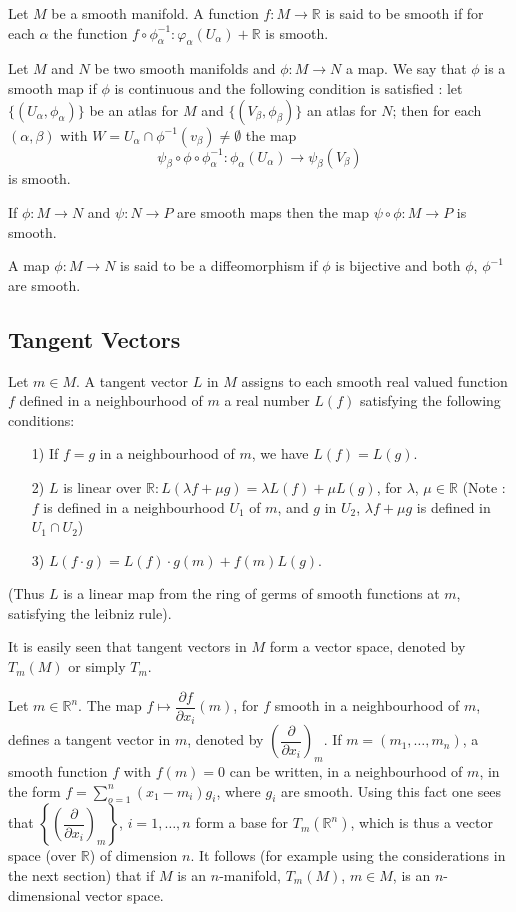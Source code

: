 Let $M$ be a smooth manifold. A function $f:M\to \mathbb{R}$ is said to be smooth if for each $\alpha$ the function $f\circ \phi^{-1}_{\alpha}:\varphi_{\alpha}(U_{\alpha})+\mathbb{R}$ is smooth.

Let $M$ and $N$ be two smooth manifolds and $\phi:M\to N$ a map. We say that $\phi$ is a smooth map if $\phi$ is continuous and the following condition is satisfied : let $\{(U_{\alpha},\phi_{\alpha})\}$ be an atlas for $M$ and $\{(V_{\beta},\phi_{\beta})\}$ an atlas for $N$; then for each $(\alpha,\beta)$ with $W=U_{\alpha}\cap \phi^{-1}(v_{\beta})\neq \emptyset$ the map
$$
\psi_{\beta}\circ \phi \circ \phi^{-1}_{\alpha} :\phi_{\alpha}(U_{\alpha})\to \psi_{\beta}(V_{\beta})
$$
is smooth.

If $\phi:M\to N$ and $\psi : N\to P$ are smooth maps then the map $\psi\circ \phi:M\to P$ is smooth.

A map $\phi:M\to N$ is said to be a diffeomorphism if $\phi$ is bijective and both $\phi$, $\phi^{-1}$ are smooth.

\subsection*{Tangent Vectors}
\pageoriginale

Let $m\in M$. A tangent vector $L$ in $M$ assigns to each smooth real valued function $f$ defined in a neighbourhood of $m$ a real number $L(f)$ satisfying the following conditions:
\begin{itemize}
\item[1)] If $f=g$ in a neighbourhood of $m$, we have $L(f)=L(g)$.

\item[2)] $L$ is linear over $\mathbb{R}:L(\lambda f+\mu g)=\lambda L(f)+\mu L(g)$, for $\lambda$, $\mu\in \mathbb{R}$ (Note : $f$ is defined in a neighbourhood $U_{1}$ of $m$, and $g$ in $U_{2}$, $\lambda f+\mu g$ is defined in $U_{1}\cap U_{2}$)

\item[3)] $L(f\cdot g)=L(f)\cdot g(m)+f(m)L(g)$.
\end{itemize}

(Thus $L$ is a linear map from the ring of germs of smooth functions at $m$, satisfying the leibniz rule).

It is easily seen that tangent vectors in $M$ form a vector space, denoted by $T_{m}(M)$ or simply $T_{m}$.

Let $m\in \mathbb{R}^{n}$. The map $f\mapsto \dfrac{\partial f}{\partial x_{i}}(m)$, for $f$ smooth in a neighbourhood of $m$, defines a tangent vector in $m$, denoted by $\left(\dfrac{\partial}{\partial x_{i}}\right)_{m}$. If $m=(m_{1},\ldots,m_{n})$, a smooth function $f$ with $f(m)=0$ can be written, in a neighbourhood of $m$, in the form $f=\sum\limits^{n}_{o=1}(x_{1}-m_{i})g_{i}$, where $g_{i}$ are smooth. Using this fact one sees that $\left\{\left(\dfrac{\partial}{\partial x_{i}}\right)_{m}\right\}$, $i=1,\ldots,n$ form a base for $T_{m}(\mathbb{R}^{n})$, which is thus a vector space (over $\mathbb{R}$) of dimension $n$. It follows (for example using the considerations in the next section) that if $M$ is an $n$-manifold, $T_{m}(M)$, $m\in M$, is an $n$-dimensional vector space.

